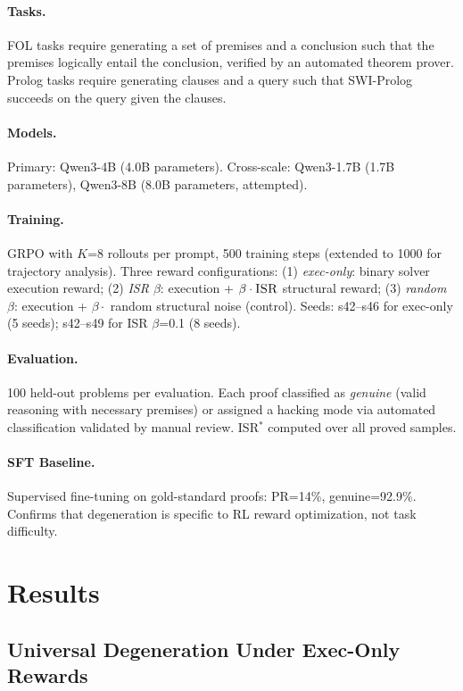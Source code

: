 \documentclass[11pt,a4paper]{article}
\newcommand{\isr}{\textsc{ISR}}
\newcommand{\pr}{\textsc{PR}}
\newcommand{\grpo}{\textsc{GRPO}}
\begin{document}
\paragraph{Tasks.}
FOL tasks require generating a set of premises and a conclusion such that the premises logically entail the conclusion, verified by an automated theorem prover.
Prolog tasks require generating clauses and a query such that SWI-Prolog succeeds on the query given the clauses.

\paragraph{Models.}
Primary: Qwen3-4B (4.0B parameters).
Cross-scale: Qwen3-1.7B (1.7B parameters), Qwen3-8B (8.0B parameters, attempted).

\paragraph{Training.}
\grpo{} with $K$=8 rollouts per prompt, 500 training steps (extended to 1000 for trajectory analysis).
Three reward configurations: (1) \emph{exec-only}: binary solver execution reward; (2) \emph{\isr{} $\beta$}: execution + $\beta \cdot \isr{}$ structural reward; (3) \emph{random $\beta$}: execution + $\beta \cdot$ random structural noise (control).
Seeds: s42--s46 for exec-only (5 seeds); s42--s49 for \isr{} $\beta$=0.1 (8 seeds).

\paragraph{Evaluation.}
100 held-out problems per evaluation. Each proof classified as \emph{genuine} (valid reasoning with necessary premises) or assigned a hacking mode via automated classification validated by manual review.
\isr{}$^*$ computed over all proved samples.

\paragraph{SFT Baseline.}
Supervised fine-tuning on gold-standard proofs: \pr{}=14\%, genuine=92.9\%. Confirms that degeneration is specific to RL reward optimization, not task difficulty.

\section{Results}

\subsection{Universal Degeneration Under Exec-Only Rewards}
\label{sec:exec-only}
\end{document}
